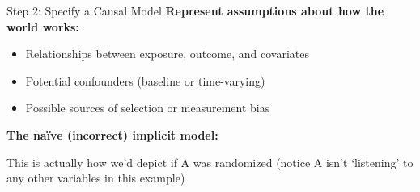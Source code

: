 \documentclass[aspectratio=169]{beamer}
\begin{document}
\begin{frame}{Step 2: Specify a Causal Model}
  \small
  \textbf{Represent assumptions about how the world works:}
  \begin{itemize}
    \item Relationships between exposure, outcome, and covariates
    \item Potential confounders (baseline or time-varying)
    \item Possible sources of selection or measurement bias
  \end{itemize}
  \vspace{0.5em}

  \textbf{The na\"ive (incorrect) implicit model:}
  \begin{center}
  \end{center}
  \vspace{0.3em}

  This is actually how we'd depict if A was randomized (notice A isn't `listening' to any other variables in this example)

\end{frame}
\end{document}
